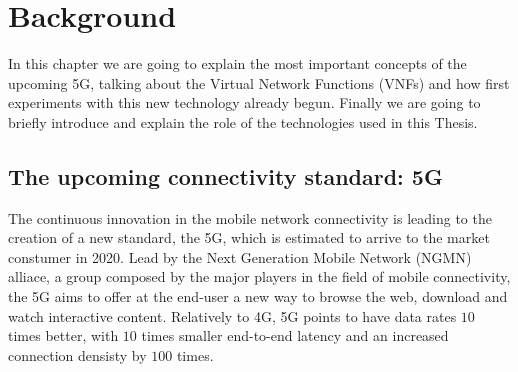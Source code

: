 \chapter{Background}
\label{chap:background}

In this chapter we are going to explain the most important concepts of the 
upcoming 5G, talking about the Virtual Network Functions (VNFs) and how first 
experiments with this new technology already begun. Finally we are going to 
briefly introduce and explain the role of the technologies used in this 
Thesis.

\section{The upcoming connectivity standard: 5G}
The continuous innovation in the mobile network connectivity is leading to the
creation of a new standard, the 5G, which is estimated to arrive to the market
constumer in 2020. Lead by the Next Generation Mobile Network (NGMN)
alliace, a group composed by the major players in the field of mobile
connectivity, the 5G aims to offer at the end-user a new way to browse the web,
download and watch interactive content. Relatively to 4G, 5G points to have data
rates $10$ times better, with $10$ times smaller end-to-end latency and an
increased connection densisty by $100$ times.


